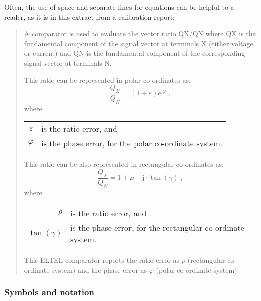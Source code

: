 Often, the use of space and separate lines for equations can be helpful to a reader, as it is in this extract from a calibration report:
\begin{quote}

A comparator is used to evaluate the vector ratio QX/QN where QX is the fundamental component of the signal vector at terminals X (either voltage or current) and QN is the fundamental component of the corresponding signal vector at terminals N. 

This ratio can be represented in polar co-ordinates as:
\[
\frac{Q_X}{Q_N} = (1 + \varepsilon) e^{\mathrm{j}\varphi} \;,
\]
where:

\begin{tabular}{rl}
$\varepsilon$ & is the ratio error, and \\
$\varphi$ & is the phase error, for the polar co-ordinate system. 
\end{tabular}

\vspace{\baselineskip}
This ratio can be also represented in rectangular co-ordinates as:
\[
\frac{Q_X}{Q_N} = 1 + \rho + \mathrm{j}\cdot\tan (\gamma) \;,
\]
where
\begin{tabular}{rl}
	$\rho$ &  is the ratio error, and \\
	$\tan (\gamma)$ & is the phase error, for the rectangular co-ordinate system. 
\end{tabular}

\vspace{\baselineskip}	
This ELTEL comparator reports the ratio error as $\rho$ (rectangular co-ordinate system) and the phase error as $\varphi$ (polar co-ordinate system).
\end{quote}

\subsubsection{Symbols and notation}
